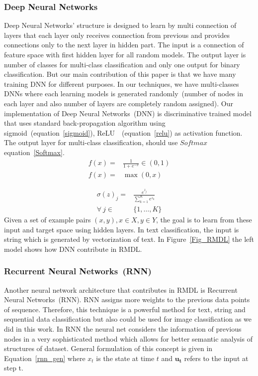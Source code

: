 \documentclass[sigconf, final]{acmart}
\begin{document}
\subsubsection{Deep Neural Networks}\label{subsubsec:DNN}
Deep Neural Networks' structure is designed to learn by multi connection of layers that each layer only receives connection from previous and provides connections only to the next layer in hidden part. The input is a connection of feature space with first hidden layer for all random models. The output layer is number of classes for multi-class classification and only one output for binary classification. But our main contribution of this paper is that we have many training DNN for different purposes. In our techniques, we have multi-classes DNNs where each learning models is generated randomly~(number of nodes in each layer and also number of layers are completely random assigned). Our implementation of Deep Neural Networks~(DNN) is discriminative trained model that uses standard back-propagation algorithm using sigmoid~(equation~\ref{sigmoid}), ReLU~\cite{nair2010rectified}~(equation~\ref{relu}) as activation function. The output layer for multi-class classification, should use $Softmax$ equation~\ref{Softmax}.
\begin{align}
\label{sigmoid}
f(x) =& \frac{1}{1+e^{-x}}\in (0,1)\\
\label{relu}
f(x) =& \max(0,x)
\end{align}

\begin{align}
\label{Softmax}
\sigma(z)_j =& \frac{e^{z_j}}{\sum_{k=1}^K e^{z_k}}\\ 
\forall   ~j \in &\{1,\hdots, K\} \nonumber
\end{align}
 Given a set of example pairs $(x,y),x\in X,y\in Y$, the goal is to learn from these input and target space using hidden layers. In text classification, the input is string which is generated by vectorization of text. In Figure~\ref{Fig_RMDL} the left model shows how DNN contribute in RMDL.


\subsubsection{Recurrent Neural Networks~(RNN)}\label{subsubsec:RNN}
Another neural network architecture that contributes in RMDL is Recurrent Neural Networks~(RNN). RNN assigns more weights to the previous data points of sequence. Therefore, this technique is a powerful method for text, string and sequential data classification but also  could be used for image classification as we did in this work. In RNN the neural net considers the information of previous nodes in a very sophisticated method which allows for better semantic analysis of structures of dataset. General formulation of this concept is given in Equation~\ref{rnn_gen} where $x_t$ is the state at time $t$ and $\boldsymbol{u_t}$ refers to the input at step t.
\end{document}
